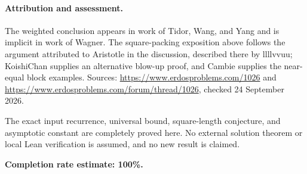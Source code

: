 \paragraph{Attribution and assessment.}
The weighted conclusion appears in work of Tidor, Wang, and Yang and is implicit in work of Wagner. The square-packing exposition above follows the argument attributed to Aristotle in the discussion, described there by llllvvuu; KoishiChan supplies an alternative blow-up proof, and Cambie supplies the near-equal block examples. Sources: \url{https://www.erdosproblems.com/1026} and \url{https://www.erdosproblems.com/forum/thread/1026}, checked 24 September 2026.

The exact input recurrence, universal bound, square-length conjecture, and asymptotic constant are completely proved here. No external solution theorem or local Lean verification is assumed, and no new result is claimed.

\textbf{Completion rate estimate: 100\%.}
